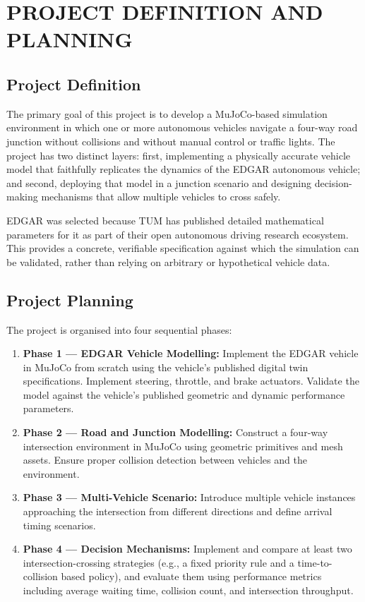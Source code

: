 \documentclass[a4paper,12pt]{report}
\begin{document}
\chapter{PROJECT DEFINITION AND PLANNING}

\section{Project Definition}

The primary goal of this project is to develop a MuJoCo-based simulation
environment in which one or more autonomous vehicles navigate a four-way road
junction without collisions and without manual control or traffic lights. The
project has two distinct layers: first, implementing a physically accurate
vehicle model that faithfully replicates the dynamics of the EDGAR autonomous
vehicle; and second, deploying that model in a junction scenario and designing
decision-making mechanisms that allow multiple vehicles to cross safely.

EDGAR was selected because TUM has published detailed mathematical parameters
for it as part of their open autonomous driving research ecosystem. This
provides a concrete, verifiable specification against which the simulation can
be validated, rather than relying on arbitrary or hypothetical vehicle data.

\section{Project Planning}

The project is organised into four sequential phases:

\begin{enumerate}
  \item \textbf{Phase 1 — EDGAR Vehicle Modelling:} Implement the EDGAR vehicle
        in MuJoCo from scratch using the vehicle's published digital twin
        specifications. Implement steering, throttle, and brake actuators.
        Validate the model against the vehicle's published geometric and dynamic
        performance parameters.

  \item \textbf{Phase 2 — Road and Junction Modelling:} Construct a four-way
        intersection environment in MuJoCo using geometric primitives and mesh
        assets. Ensure proper collision detection between vehicles and the
        environment.

  \item \textbf{Phase 3 — Multi-Vehicle Scenario:} Introduce multiple vehicle
        instances approaching the intersection from different directions and
        define arrival timing scenarios.

  \item \textbf{Phase 4 — Decision Mechanisms:} Implement and compare at least
        two intersection-crossing strategies (e.g., a fixed priority rule and a
        time-to-collision based policy), and evaluate them using performance
        metrics including average waiting time, collision count, and intersection
        throughput.
\end{enumerate}
\end{document}
